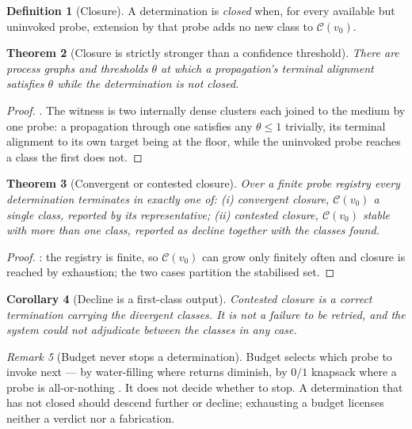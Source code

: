 \documentclass[twocolumn,11pt,a4paper]{article}
\theoremstyle{sup}
\newtheorem{theorem}{Theorem}[section]
\newtheorem{corollary}[theorem]{Corollary}
\theoremstyle{definition}
\newtheorem{definition}[theorem]{Definition}
\theoremstyle{remark}
\newtheorem{remark}[theorem]{Remark}
\newcommand{\Cell}{\mathcal{C}}
\begin{document}
\begin{definition}[Closure]
\label{def:closure-srg}
A determination is \emph{closed} when, for every available but uninvoked probe,
extension by that probe adds no new class to $\Cell(v_0)$.
\end{definition}

\begin{theorem}[Closure is strictly stronger than a confidence threshold]
\label{thm:closure-stronger-srg}
There are process graphs and thresholds $\theta$ at which a propagation's
terminal alignment satisfies $\theta$ while the determination is not closed.
\end{theorem}

\begin{proof}
\citet[Thm.~14.3]{sachikonye2025directional}. The witness is two internally
dense clusters each joined to the medium by one probe: a propagation through
one satisfies any $\theta\le 1$ trivially, its terminal alignment to its own
target being at the floor, while the uninvoked probe reaches a class the first
does not.
\end{proof}

\begin{theorem}[Convergent or contested closure]
\label{thm:decline-srg}
Over a finite probe registry every determination terminates in exactly one of:
(i) \emph{convergent closure}, $\Cell(v_0)$ a single class, reported by its
representative; (ii) \emph{contested closure}, $\Cell(v_0)$ stable with more
than one class, reported as \emph{decline} together with the classes found.
\end{theorem}

\begin{proof}
\citet[Thm.~14.5]{sachikonye2025directional}: the registry is finite, so
$\Cell(v_0)$ can grow only finitely often and closure is reached by exhaustion;
the two cases partition the stabilised set.
\end{proof}

\begin{corollary}[Decline is a first-class output]
\label{cor:decline-srg}
Contested closure is a correct termination carrying the divergent classes. It
is not a failure to be retried, and the system could not adjudicate between the
classes in any case.
\end{corollary}

\begin{remark}[Budget never stops a determination]
\label{rem:budget}
Budget selects which probe to invoke next --- by water-filling where returns
diminish, by $0/1$ knapsack where a probe is all-or-nothing
\citep[\S13.4]{sachikonye2025directional,dantzig1957,kellerer2004}. It does not
decide whether to stop. A determination that has not closed should descend
further or decline; exhausting a budget licenses neither a verdict nor a
fabrication.
\end{remark}
\end{document}
